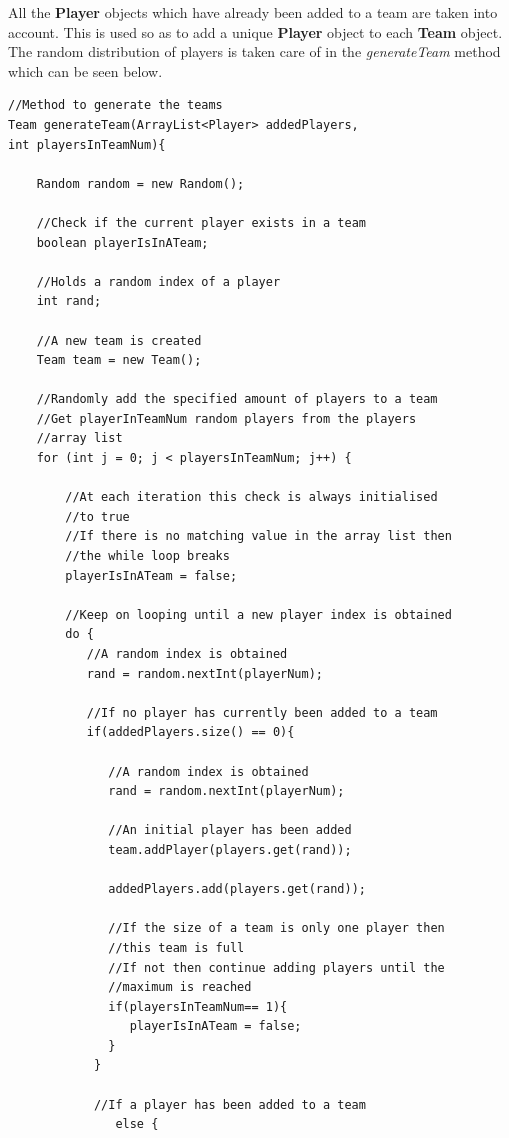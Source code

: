 \documentclass[a4paper,12pt]{extarticle}
\begin{document}
\noindent All the \textbf{Player} objects which have already been added to a team are taken into account. This is used so as to add a unique \textbf{Player} object to each \textbf{Team} object. The random distribution of players is taken care of in the \textit{generateTeam} method which can be seen below.\\

\begin{lstlisting}
//Method to generate the teams
Team generateTeam(ArrayList<Player> addedPlayers, 
int playersInTeamNum){

    Random random = new Random();

    //Check if the current player exists in a team
    boolean playerIsInATeam;

    //Holds a random index of a player
    int rand;

    //A new team is created
    Team team = new Team();

    //Randomly add the specified amount of players to a team
    //Get playerInTeamNum random players from the players 
    //array list
    for (int j = 0; j < playersInTeamNum; j++) {

        //At each iteration this check is always initialised 
        //to true
        //If there is no matching value in the array list then 
        //the while loop breaks
        playerIsInATeam = false;

        //Keep on looping until a new player index is obtained
        do {
           //A random index is obtained
           rand = random.nextInt(playerNum);

           //If no player has currently been added to a team
           if(addedPlayers.size() == 0){

              //A random index is obtained
              rand = random.nextInt(playerNum);

              //An initial player has been added
              team.addPlayer(players.get(rand));

              addedPlayers.add(players.get(rand));

              //If the size of a team is only one player then 
              //this team is full
              //If not then continue adding players until the 
              //maximum is reached
              if(playersInTeamNum== 1){
                 playerIsInATeam = false;
              }
            } 

            //If a player has been added to a team
               else {


\end{lstlisting}
\end{document}
